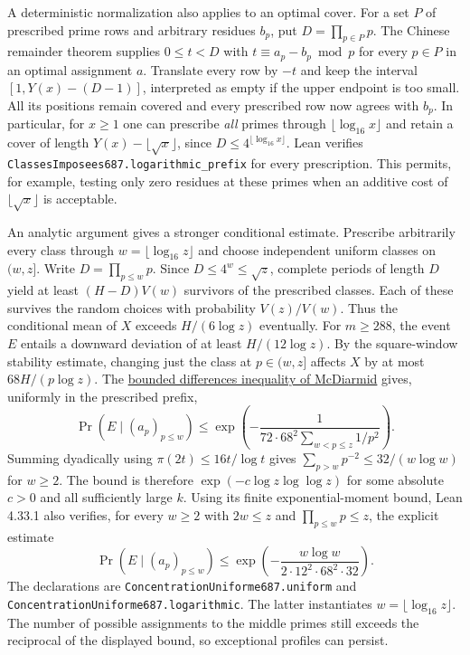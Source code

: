 \documentclass[11pt]{article}
\begin{document}
A deterministic normalization also applies to an optimal cover. For a
set $P$ of prescribed prime rows and arbitrary residues $b_p$, put
$D=\prod_{p\in P}p$. The Chinese remainder theorem supplies $0\le t<D$
with $t\equiv a_p-b_p\bmod p$ for every $p\in P$ in an optimal assignment
$a$. Translate every row by $-t$ and keep the interval
$[1,Y(x)-(D-1)]$, interpreted as empty if the upper endpoint is too
small. All its positions remain covered and every prescribed row now
agrees with $b_p$. In particular, for $x\ge1$ one can prescribe
\emph{all} primes through $\lfloor\log_{16}x\rfloor$ and retain a cover
of length $Y(x)-\lfloor\sqrt x\rfloor$, since $D\le4^{\lfloor\log_{16}x\rfloor}$.
Lean verifies \texttt{ClassesImposees687.logarithmic\_prefix} for every
prescription. This permits, for example, testing only zero residues at
these primes when an additive cost of $\lfloor\sqrt x\rfloor$ is acceptable.

An analytic argument gives a stronger conditional estimate. Prescribe
arbitrarily every class through $w=\lfloor\log_{16}z\rfloor$ and choose
independent uniform classes on $(w,z]$. Write $D=\prod_{p\le w}p$.
Since $D\le4^w\le\sqrt z$, complete periods of length $D$ yield at least
$(H-D)V(w)$ survivors of the prescribed classes. Each of these survives
the random choices with probability $V(z)/V(w)$. Thus the conditional
mean of $X$ exceeds $H/(6\log z)$ eventually. For $m\ge288$, the event
$E$ entails a downward deviation of at least $H/(12\log z)$.
By the square-window stability estimate, changing just the class at
$p\in(w,z]$ affects $X$ by at most $68H/(p\log z)$.
The \href{https://doi.org/10.1017/CBO9781107359949.008}{bounded differences
inequality of McDiarmid} gives, uniformly in the prescribed prefix,
\[
  \Pr(E\mid (a_p)_{p\le w})
  \le \exp\!\left(-\frac{1}{72\cdot68^2
                       \sum_{w<p\le z}1/p^2}\right).
\]
Summing dyadically using $\pi(2t)\le16t/\log t$ gives
$\sum_{p>w}p^{-2}\le32/(w\log w)$ for $w\ge2$. The bound is therefore
$\exp(-c\log z\log\log z)$ for some absolute $c>0$ and all sufficiently
large $k$. Using its finite exponential-moment bound, Lean 4.33.1
also verifies, for every $w\ge2$ with $2w\le z$ and
$\prod_{p\le w}p\le z$, the explicit estimate
\[
  \Pr(E\mid (a_p)_{p\le w})
      \le \exp\!\left(-\frac{w\log w}{2\cdot12^2\cdot68^2\cdot32}\right).
\]
The declarations are \texttt{ConcentrationUniforme687.uniform} and
\texttt{ConcentrationUniforme687.logarithmic}. The latter instantiates
$w=\lfloor\log_{16}z\rfloor$. The number of
possible assignments to the middle primes still exceeds the reciprocal
of the displayed bound, so exceptional profiles can persist.
\end{document}
